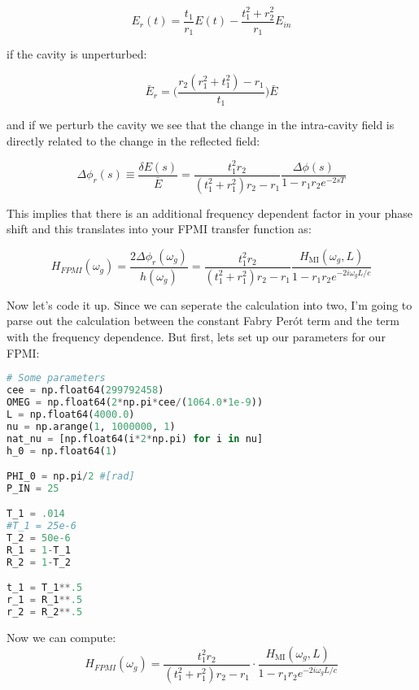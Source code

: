 \begin{equation} E_r(t) = \frac{t_1}{r_1}E(t) - \frac{t_1^2 + r_2^2}{r_1} E_{in}\end{equation}

if the cavity is unperturbed:

\begin{equation} \bar{E}_r = \bigg(\frac{r_2(r_1^2 + t_1^2) - r_1}{t_1} \bigg) \bar{E} \end{equation}

and if we perturb the cavity we see that the change in the intra-cavity
field is directly related to the change in the reflected field:

\begin{equation} \Delta \phi_r(s) \equiv \frac{\delta E(s)}{\bar{E}} = \frac{t_1^2r_2}{(t_1^2 + r_1^2)r_2 -r_1} \frac{\Delta \phi(s)}{1-r_1r_2e^{-2sT}}\end{equation}

This implies that there is an additional frequency dependent factor in
your phase shift and this translates into your FPMI transfer function
as:

\begin{equation} H_{FPMI}(\omega_g) = \frac{2 \Delta \phi_r(\omega_g)}{h(\omega_g)} =  \frac{t_1^2r_2}{(t_1^2 + r_1^2)r_2 -r_1} \frac{H_{\mathrm{MI}}(\omega_g, L)}{1-r_1r_2e^{-2i \omega_g L /c }}  \end{equation}

Now let's code it up. Since we can seperate the calculation into two, I'm going to parse out the
calculation between the constant Fabry Perót term and the term with the frequency dependence. But first, lets set up our parameters for our FPMI:

\begin{spacing}{1.2} \begin{lstlisting}[frame=single, language=Python]
# Some parameters
cee = np.float64(299792458)
OMEG = np.float64(2*np.pi*cee/(1064.0*1e-9))
L = np.float64(4000.0)
nu = np.arange(1, 1000000, 1)
nat_nu = [np.float64(i*2*np.pi) for i in nu]
h_0 = np.float64(1)

PHI_0 = np.pi/2 #[rad]
P_IN = 25

T_1 = .014
#T_1 = 25e-6 
T_2 = 50e-6
R_1 = 1-T_1
R_2 = 1-T_2

t_1 = T_1**.5
r_1 = R_1**.5
r_2 = R_2**.5
\end{lstlisting} \end{spacing}

\noindent Now we can compute:
\begin{equation} H_{FPMI}(\omega_g) =  \frac{t_1^2r_2}{(t_1^2 + r_1^2)r_2 -r_1}\cdot \frac{H_{\mathrm{MI}}(\omega_g, L)}{1-r_1r_2e^{-2i \omega_g L /c }}  \end{equation}

